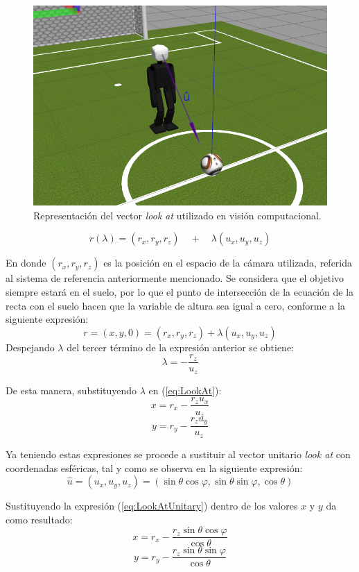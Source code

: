\begin{figure}
	\centering		
	\includegraphics[scale=2]{images/robot_lookat.png}
	\caption{Representación del vector \textit{look at} utilizado en visión computacional.}		
	\label{fig:LookAt}
\end{figure}

\begin{equation}
\label{eq:LookAt}
r(\lambda) = (r_x, r_y, r_z)\quad +\quad \lambda (u_x, u_y, u_z)
\end{equation}


En donde $(r_x, r_y, r_z)$ es la posición en el espacio de la cámara utilizada, referida al sistema de referencia anteriormente mencionado. Se considera que el objetivo siempre estará en el suelo, por lo que el punto de intersección de la ecuación de la recta con el suelo hacen que la variable de altura sea igual a cero, conforme a la siguiente expresión:
\[r = (x, y, 0) = (r_x, r_y, r_z) + \lambda (u_x, u_y, u_z)\]
Despejando $\lambda$ del tercer término de la expresión anterior se obtiene:
\[\lambda = -\frac{r_z}{u_z}\]

De esta manera, substituyendo $\lambda$ en (\ref{eq:LookAt}):
\[x = r_x-\frac{r_z u_x}{u_z}\]
\[y = r_y-\frac{r_z u_y}{u_z}\]

Ya teniendo estas expresiones se procede a sustituir al vector unitario \textit{look at} con coordenadas esféricas, tal y como se observa en la siguiente expresión:
\begin{equation}
\label{eq:LookAtUnitary}
\hat{u}=(u_x, u_y, u_z)=(\sin{ \theta}\cos{\varphi},\sin{\theta}\sin{ \varphi},\cos{\theta})
\end{equation}

Sustituyendo la expresión (\ref{eq:LookAtUnitary}) dentro de los valores $x$ y $y$ da como resultado:
\[x=r_x - \frac{r_z \sin{ \theta} \cos{\varphi}}{\cos{\theta}}\]
\[y=r_y - \frac{r_z \sin{\theta} \sin{ \varphi}}{\cos{\theta}}\]

